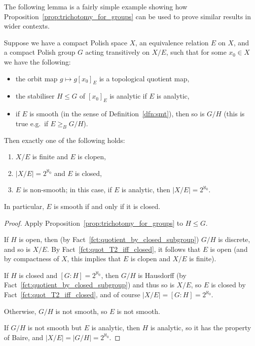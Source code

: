 	The following lemma is a fairly simple example showing how Proposition~\ref{prop:trichotomy_for_groups} can be used to prove similar results in wider contexts.
	\begin{lem}
		\label{lem:abstract_trich}
		Suppose we have a compact Polish space $X$, an equivalence relation $E$ on $X$, and a compact Polish group $G$ acting transitively on $X/E$, such that for some $x_0\in X$ we have the following:
		\begin{itemize}
			\item
			the orbit map $g\mapsto g[x_0]_E$ is a topological quotient map,
			\item
			the stabiliser $H\leq G$ of $[x_0]_E$ is analytic if $E$ is analytic,
			\item
			if $E$ is smooth (in the sense of Definition~\ref{dfn:smt}), then so is $G/H$ (this is true e.g.\ if $E\geq_B G/H$).
		\end{itemize}
		Then exactly one of the following holds:
		\begin{enumerate}
			\item
			$X/E$ is finite and $E$ is clopen,
			\item
			$|X/E|=2^{\aleph_0}$ and $E$ is closed,
			\item
			$E$ is non-smooth; in this case, if $E$ is analytic, then $|X/E|=2^{\aleph_0}$.
		\end{enumerate}
		In particular, $E$ is smooth if and only if it is closed.
	\end{lem}
	\begin{proof}
		Apply Proposition~\ref{prop:trichotomy_for_groups} to $H\leq G$.
		
		If $H$ is open, then (by Fact~\ref{fct:quotient_by_closed_subgroup}) $G/H$ is discrete, and so is $X/E$. By Fact~\ref{fct:quot_T2_iff_closed}, it follows that $E$ is open (and by compactness of $X$, this implies that $E$ is clopen and $X/E$ is finite).
		
		If $H$ is closed and $[G:H]=2^{\aleph_0}$, then $G/H$ is Hausdorff (by Fact~\ref{fct:quotient_by_closed_subgroup}) and thus so is $X/E$, so $E$ is closed by Fact~\ref{fct:quot_T2_iff_closed}, and of course $\lvert X/E\rvert=[G:H]=2^{\aleph_0}$.
		
		Otherwise, $G/H$ is not smooth, so $E$ is not smooth.
		
		If $G/H$ is not smooth but $E$ is analytic, then $H$ is analytic, so it has the property of Baire, and $\lvert X/E\rvert=\lvert G/H\rvert=2^{\aleph_0}$.
	\end{proof}
	
